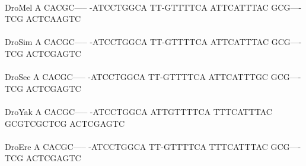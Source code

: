 \documentclass[11pt,twoside,reqno,a4paper]{article}
\begin{document}
{\\
DroMel	A	CACGC-----	-ATCCTGGCA	TT-GTTTTCA	ATTCATTTAC	GCG----TCG	ACTCAAGTC\\
\hspace*{7\charwidth}\hspace*{1\charwidth}\hspace*{1\charwidth}\hspace*{1\charwidth}\hspace*{1\charwidth}\hspace*{1\charwidth}\hspace*{1\charwidth}\\
DroSim	A	CACGC-----	-ATCCTGGCA	TT-GTTTTCA	ATTCATTTAC	GCG----TCG	ACTCGAGTC\\
\hspace*{7\charwidth}\hspace*{1\charwidth}\hspace*{1\charwidth}\hspace*{1\charwidth}\hspace*{1\charwidth}\hspace*{1\charwidth}\hspace*{1\charwidth}\\
DroSec	A	CACGC-----	-ATCCTGGCA	TT-GTTTTCA	ATTCATTTGC	GCG----TCG	ACTCGAGTC\\
\hspace*{7\charwidth}\hspace*{1\charwidth}\hspace*{1\charwidth}\hspace*{1\charwidth}\hspace*{1\charwidth}\hspace*{1\charwidth}\hspace*{1\charwidth}\\
DroYak	A	CACGC-----	-ATCCTGGCA	ATTGTTTTCA	TTTCATTTAC	GCGTCGCTCG	ACTCGAGTC\\
\hspace*{7\charwidth}\hspace*{1\charwidth}\hspace*{1\charwidth}\hspace*{1\charwidth}\hspace*{1\charwidth}\hspace*{1\charwidth}\hspace*{1\charwidth}\\
DroEre	A	CACGC-----	-ATCCTGGCA	TT-GTTTTCA	TTTCATTTAC	GCG----TCG	ACTCGAGTC\\
\hspace*{7\charwidth}\hspace*{1\charwidth}\hspace*{1\charwidth}\hspace*{1\charwidth}\hspace*{1\charwidth}\hspace*{1\charwidth}\hspace*{1\charwidth}\\
}
\end{document}

